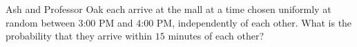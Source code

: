 Ash and Professor Oak each arrive at the mall at a time chosen uniformly at random between 3:00 PM and 4:00 PM, independently of each other. What is the probability that they arrive within $15$ minutes of each other?
